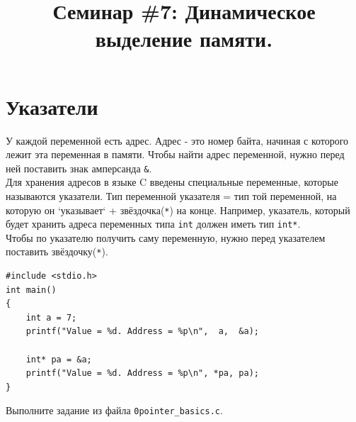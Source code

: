 \documentclass{article}
\begin{document}
\newpage

\title{Семинар \#7: Динамическое выделение памяти.\vspace{-5ex}}\date{}\maketitle
\section*{Указатели}
У каждой переменной есть адрес. Адрес - это номер байта, начиная с которого лежит эта переменная в памяти. Чтобы найти адрес переменной, нужно перед ней поставить знак амперсанда \texttt{\&}. \\
Для хранения адресов в языке C введены специальные переменные, которые называются указатели. Тип переменной указателя = тип той переменной, на которую он `указывает` + звёздочка(\texttt{*}) на конце. Например, указатель, который будет хранить адреса переменных типа \texttt{int} должен иметь тип \texttt{int*}. \\
Чтобы по указателю получить саму переменную, нужно перед указателем поставить звёздочку(\texttt{*}).
\begin{lstlisting}
#include <stdio.h>
int main()
{
    int a = 7;
    printf("Value = %d. Address = %p\n",  a,  &a);
    
    int* pa = &a;
    printf("Value = %d. Address = %p\n", *pa, pa);
}
\end{lstlisting}
Выполните задание из файла \texttt{0pointer\_basics.c}.
\end{document}
